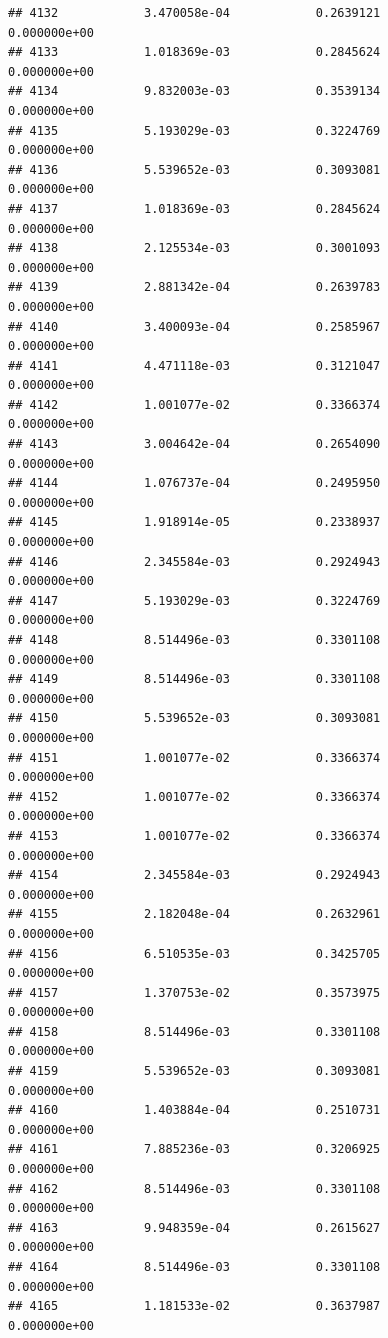 \documentclass[
]{article}
\begin{document}
\begin{verbatim}
## 4132            3.470058e-04            0.2639121            0.000000e+00
## 4133            1.018369e-03            0.2845624            0.000000e+00
## 4134            9.832003e-03            0.3539134            0.000000e+00
## 4135            5.193029e-03            0.3224769            0.000000e+00
## 4136            5.539652e-03            0.3093081            0.000000e+00
## 4137            1.018369e-03            0.2845624            0.000000e+00
## 4138            2.125534e-03            0.3001093            0.000000e+00
## 4139            2.881342e-04            0.2639783            0.000000e+00
## 4140            3.400093e-04            0.2585967            0.000000e+00
## 4141            4.471118e-03            0.3121047            0.000000e+00
## 4142            1.001077e-02            0.3366374            0.000000e+00
## 4143            3.004642e-04            0.2654090            0.000000e+00
## 4144            1.076737e-04            0.2495950            0.000000e+00
## 4145            1.918914e-05            0.2338937            0.000000e+00
## 4146            2.345584e-03            0.2924943            0.000000e+00
## 4147            5.193029e-03            0.3224769            0.000000e+00
## 4148            8.514496e-03            0.3301108            0.000000e+00
## 4149            8.514496e-03            0.3301108            0.000000e+00
## 4150            5.539652e-03            0.3093081            0.000000e+00
## 4151            1.001077e-02            0.3366374            0.000000e+00
## 4152            1.001077e-02            0.3366374            0.000000e+00
## 4153            1.001077e-02            0.3366374            0.000000e+00
## 4154            2.345584e-03            0.2924943            0.000000e+00
## 4155            2.182048e-04            0.2632961            0.000000e+00
## 4156            6.510535e-03            0.3425705            0.000000e+00
## 4157            1.370753e-02            0.3573975            0.000000e+00
## 4158            8.514496e-03            0.3301108            0.000000e+00
## 4159            5.539652e-03            0.3093081            0.000000e+00
## 4160            1.403884e-04            0.2510731            0.000000e+00
## 4161            7.885236e-03            0.3206925            0.000000e+00
## 4162            8.514496e-03            0.3301108            0.000000e+00
## 4163            9.948359e-04            0.2615627            0.000000e+00
## 4164            8.514496e-03            0.3301108            0.000000e+00
## 4165            1.181533e-02            0.3637987            0.000000e+00

\end{verbatim}
\end{document}
